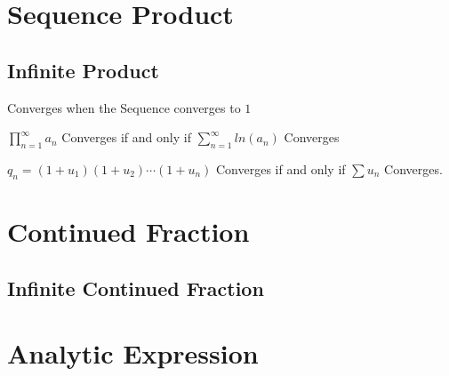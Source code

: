 \section{Sequence Product}\label{sec:sequence_product}

\subsection{Infinite Product}\label{sec:infinite_product}

Converges when the Sequence converges to $1$

$\prod_{n=1}^\infty a_n$ Converges if and only if $\sum_{n=1}^\infty
ln(a_n)$ Converges

$q_n = (1 + u_1)(1 + u_2)\cdots(1 + u_n)$ Converges if and only if
$\sum u_n$ Converges.



\section{Continued Fraction}\label{sec:continued_fraction}

\subsection{Infinite Continued Fraction}\label{sec:infinite_continued_fraction}



\section{Analytic Expression}\label{sec:analytic_expression}

